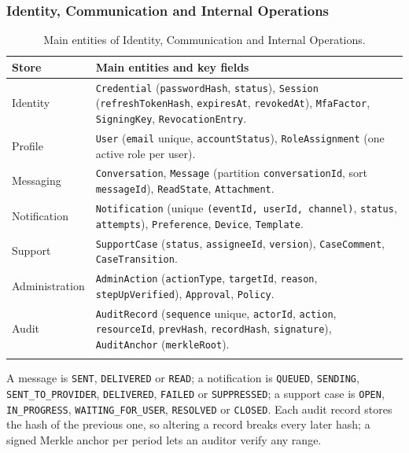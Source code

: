 \subsubsection{Identity, Communication and Internal Operations}
\label{sec:id-model}

\begin{longtable}{@{}L{3.0cm}L{10.8cm}@{}}
\toprule
\textbf{Store} & \textbf{Main entities and key fields} \\
\midrule
\endhead
Identity & \texttt{Credential} (\texttt{passwordHash}, \texttt{status}),
  \texttt{Session} (\texttt{refreshTokenHash}, \texttt{expiresAt},
  \texttt{revokedAt}), \texttt{MfaFactor}, \texttt{SigningKey},
  \texttt{RevocationEntry}. \\
Profile & \texttt{User} (\texttt{email} unique, \texttt{accountStatus}),
  \texttt{RoleAssignment} (one active role per user). \\
Messaging & \texttt{Conversation}, \texttt{Message} (partition
  \texttt{conversationId}, sort \texttt{messageId}), \texttt{ReadState},
  \texttt{Attachment}. \\
Notification & \texttt{Notification} (unique \texttt{(eventId, userId,
  channel)}, \texttt{status}, \texttt{attempts}), \texttt{Preference},
  \texttt{Device}, \texttt{Template}. \\
Support & \texttt{SupportCase} (\texttt{status}, \texttt{assigneeId},
  \texttt{version}), \texttt{CaseComment}, \texttt{CaseTransition}. \\
Administration & \texttt{AdminAction} (\texttt{actionType},
  \texttt{targetId}, \texttt{reason}, \texttt{stepUpVerified}),
  \texttt{Approval}, \texttt{Policy}. \\
Audit & \texttt{AuditRecord} (\texttt{sequence} unique, \texttt{actorId},
  \texttt{action}, \texttt{resourceId}, \texttt{prevHash},
  \texttt{recordHash}, \texttt{signature}), \texttt{AuditAnchor}
  (\texttt{merkleRoot}). \\
\bottomrule
\caption{Main entities of Identity, Communication and Internal Operations.}
\label{tab:id-model}
\end{longtable}

A message is \texttt{SENT}, \texttt{DELIVERED} or \texttt{READ}; a
notification is \texttt{QUEUED}, \texttt{SENDING}, \texttt{SENT\_TO\_PROVIDER},
\texttt{DELIVERED}, \texttt{FAILED} or \texttt{SUPPRESSED}; a support case is
\texttt{OPEN}, \texttt{IN\_PROGRESS}, \texttt{WAITING\_FOR\_USER},
\texttt{RESOLVED} or \texttt{CLOSED}. Each audit record stores the hash of the
previous one, so altering a record breaks every later hash; a signed Merkle
anchor per period lets an auditor verify any range.
\endgroup

